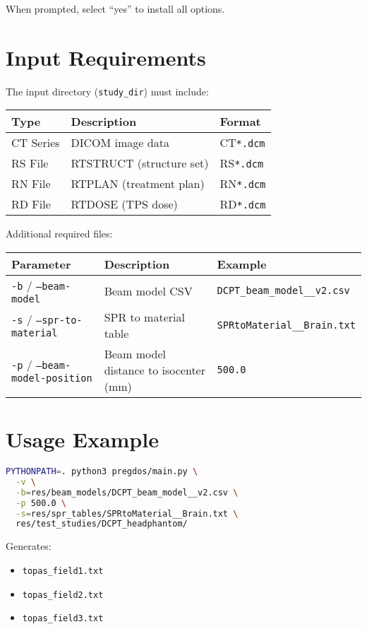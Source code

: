 \documentclass[11pt]{article}
\begin{document}
When prompted, select ``yes'' to install all options.

\section{Input Requirements}

The input directory (\texttt{study\_dir}) must include:

\begin{longtable}{|l|l|l|}
\hline
\textbf{Type} & \textbf{Description} & \textbf{Format} \\
\hline
CT Series & DICOM image data & CT\texttt{*.dcm} \\
RS File & RTSTRUCT (structure set) & RS\texttt{*.dcm} \\
RN File & RTPLAN (treatment plan) & RN\texttt{*.dcm} \\
RD File & RTDOSE (TPS dose) & RD\texttt{*.dcm} \\
\hline
\end{longtable}

Additional required files:

\begin{longtable}{|l|l|l|}
\hline
\textbf{Parameter} & \textbf{Description} & \textbf{Example} \\
\hline
\texttt{-b} / \texttt{--beam-model} & Beam model CSV & \texttt{DCPT\_beam\_model\_\_v2.csv} \\
\texttt{-s} / \texttt{--spr-to-material} & SPR to material table & \texttt{SPRtoMaterial\_\_Brain.txt} \\
\texttt{-p} / \texttt{--beam-model-position} & Beam model distance to isocenter (mm) & \texttt{500.0} \\
\hline
\end{longtable}

\section{Usage Example}

\begin{lstlisting}[language=bash]
PYTHONPATH=. python3 pregdos/main.py \
  -v \
  -b=res/beam_models/DCPT_beam_model__v2.csv \
  -p 500.0 \
  -s=res/spr_tables/SPRtoMaterial__Brain.txt \
  res/test_studies/DCPT_headphantom/
\end{lstlisting}

Generates:
\begin{itemize}
    \item \texttt{topas\_field1.txt}
    \item \texttt{topas\_field2.txt}
    \item \texttt{topas\_field3.txt}
\end{itemize}
\end{document}
